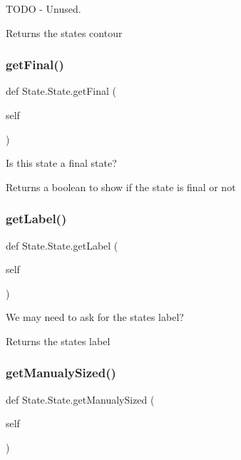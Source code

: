 T\+O\+DO -\/ Unused. 

\begin{DoxyReturn}{Returns}
the state\textquotesingle{}s contour 
\end{DoxyReturn}
\mbox{\label{classState_1_1State_af3be869fa4fa723d022ce8df0c48dec6}} 
\subsubsection{\texorpdfstring{getFinal()}{getFinal()}}
{\footnotesize\ttfamily def State.\+State.\+get\+Final (\begin{DoxyParamCaption}\item[{}]{self }\end{DoxyParamCaption})}



Is this state a final state? 

\begin{DoxyReturn}{Returns}
a boolean to show if the state is final or not 
\end{DoxyReturn}
\mbox{\label{classState_1_1State_a1f81501729708ce030ae8a29889482d2}} 
\subsubsection{\texorpdfstring{getLabel()}{getLabel()}}
{\footnotesize\ttfamily def State.\+State.\+get\+Label (\begin{DoxyParamCaption}\item[{}]{self }\end{DoxyParamCaption})}



We may need to ask for the state\textquotesingle{}s label? 

\begin{DoxyReturn}{Returns}
the state\textquotesingle{}s label 
\end{DoxyReturn}
\mbox{\label{classState_1_1State_a7d796ed9f41f65938e2aaa1e47fefb63}} 
\subsubsection{\texorpdfstring{getManualySized()}{getManualySized()}}
{\footnotesize\ttfamily def State.\+State.\+get\+Manualy\+Sized (\begin{DoxyParamCaption}\item[{}]{self }\end{DoxyParamCaption})}



